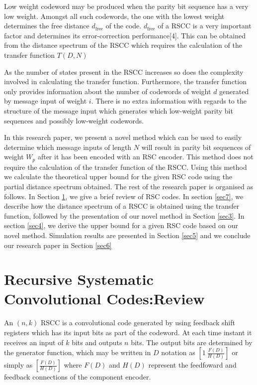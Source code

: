 \documentclass[conference]{IEEEtran}
\begin{document}
Low weight codeword may be produced when the parity bit sequence has a very low weight. Amongst all such codewords, the one with the lowest weight determines the free distance $d_{\text{free}}$ of the code. 
$d_{\text{free}}$  of a RSCC is a very important factor and determines its error-correction performance[4].  This can be obtained from the distance spectrum of the RSCC which requires the calculation of the transfer function $T(D,N)$ %

 As the number of states present in the RSCC increases so does the complexity involved in calculating the transfer function. Furthermore, the transfer function only provides information about the number of codewords of weight $d$ generated by message input of weight $i$. There is no extra information with regards to the structure of the message input which generates which low-weight parity bit sequences and possibly low-weight codewords.

In this research paper, we present a novel method which can be used to easily determine which message inputs of length $N$ will result in parity bit sequences of weight $W_p$ after it has been encoded with an RSC encoder. This method does not require the calculation of the transfer function of the RSCC. Using this method we calculate the theoretical upper bound for the given RSC code using the partial distance spectrum obtained. The rest of the research paper is organised as follows. In Section \ref{sec2}, we give a brief review of RSC codes. In section \ref{sec7}, we describe how the distance spectrum of a RSCC is obtained using the transfer function, followed by the presentation of our novel method in Section \ref{sec3}. In section \ref{sec4}, we derive the upper bound for a given RSC code based on our novel method. Simulation results are presented in Section \ref{sec5} and we conclude our research paper in Section \ref{sec6}

\section{Recursive Systematic Convolutional Codes:Review}
\label{sec2}

An  $(n,k)$ RSCC is a convolutional code generated by using feedback shift registers which has its input bits as part of the codeword. At each time instant it receives an input of $k$ bits and outputs $n$ bits. The output bits are determined by the generator function, which may be written in $D$ notation as  $[1 ~\frac{F(D)}{H(D)}]$ or simply as $[\frac{F(D)}{H(D)}]$ where $F(D)$ and $H(D)$ represent the feedfoward and feedback connections of the component encoder.
\end{document}
